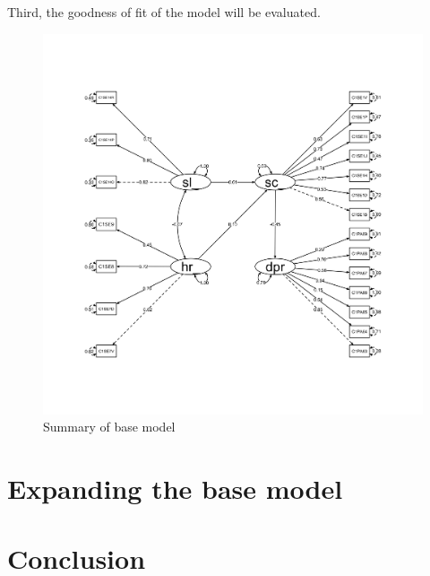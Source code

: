 \documentclass[11pt]{article}
\begin{document}
Third, the goodness of fit of the model will be evaluated.




\begin{table}[h!]
\captionsetup{singlelinecheck=off}
\caption{Test statistics}
\end{table}

\begin{figure}[h!]
\centering
\includegraphics[width=14cm]{../visualizations/base_model.png}
\caption{Summary of base model}
\end{figure}

\FloatBarrier
\pagebreak
\section{Expanding the base model}

\FloatBarrier
\pagebreak
\section{Conclusion}
\end{document}
